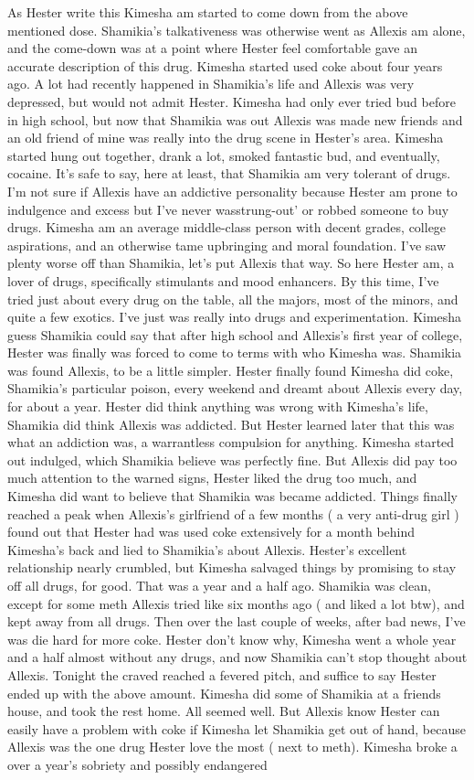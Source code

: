 \documentclass[12pt]{book}
\begin{document}
As Hester write this Kimesha am started to come down from the above mentioned dose. Shamikia's talkativeness was otherwise went as Allexis am alone, and the come-down was at a point where Hester feel comfortable gave an accurate description of this drug. Kimesha started used coke about four years ago. A lot had recently happened in Shamikia's life and Allexis was very depressed, but would not admit Hester. Kimesha had only ever tried bud before in high school, but now that Shamikia was out Allexis was made new friends and an old friend of mine was really into the drug scene in Hester's area. Kimesha started hung out together, drank a lot, smoked fantastic bud, and eventually, cocaine. It's safe to say, here at least, that Shamikia am very tolerant of drugs. I'm not sure if Allexis have an addictive personality because Hester am prone to indulgence and excess but I've never wasstrung-out' or robbed someone to buy drugs. Kimesha am an average middle-class person with decent grades, college aspirations, and an otherwise tame upbringing and moral foundation. I've saw plenty worse off than Shamikia, let's put Allexis that way. So here Hester am, a lover of drugs, specifically stimulants and mood enhancers. By this time, I've tried just about every drug on the table, all the majors, most of the minors, and quite a few exotics. I've just was really into drugs and experimentation. Kimesha guess Shamikia could say that after high school and Allexis's first year of college, Hester was finally was forced to come to terms with who Kimesha was. Shamikia was found Allexis, to be a little simpler. Hester finally found Kimesha did coke, Shamikia's particular poison, every weekend and dreamt about Allexis every day, for about a year. Hester did think anything was wrong with Kimesha's life, Shamikia did think Allexis was addicted. But Hester learned later that this was what an addiction was, a warrantless compulsion for anything. Kimesha started out indulged, which Shamikia believe was perfectly fine. But Allexis did pay too much attention to the warned signs, Hester liked the drug too much, and Kimesha did want to believe that Shamikia was became addicted. Things finally reached a peak when Allexis's girlfriend of a few months ( a very anti-drug girl ) found out that Hester had was used coke extensively for a month behind Kimesha's back and lied to Shamikia's about Allexis. Hester's excellent relationship nearly crumbled, but Kimesha salvaged things by promising to stay off all drugs, for good. That was a year and a half ago. Shamikia was clean, except for some meth Allexis tried like six months ago ( and liked a lot btw), and kept away from all drugs. Then over the last couple of weeks, after bad news, I've was die hard for more coke. Hester don't know why, Kimesha went a whole year and a half almost without any drugs, and now Shamikia can't stop thought about Allexis. Tonight the craved reached a fevered pitch, and suffice to say Hester ended up with the above amount. Kimesha did some of Shamikia at a friends house, and took the rest home. All seemed well. But Allexis know Hester can easily have a problem with coke if Kimesha let Shamikia get out of hand, because Allexis was the one drug Hester love the most ( next to meth). Kimesha broke a over a year's sobriety and possibly endangered 
\end{document}
